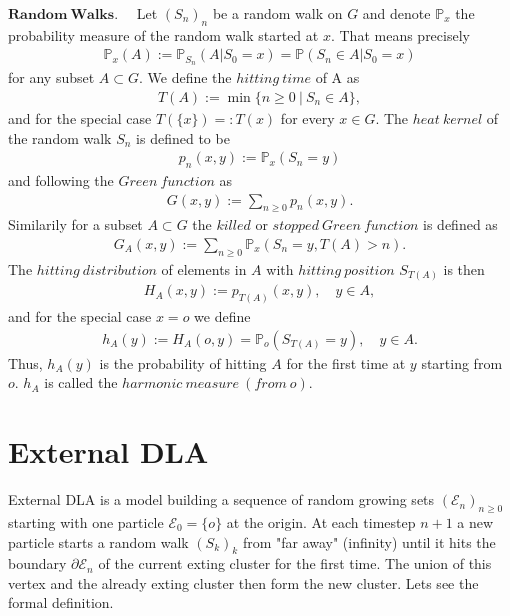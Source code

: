 \documentclass[12pt,a4paper]{scrartcl}
\numberwithin{equation}{section}
\numberwithin{equation}{section}%
\theoremstyle{definition}
\theoremstyle{definition}
\begin{document}
\noindent $\boldsymbol{Random\ Walks}.\quad$ Let $(S_n)_n$ be a random walk on $G$ and denote $\mathbb{P}_x$ the probability measure of the random walk started at $x$. That means precisely 
\begin{align*}
	\mathbb{P}_x(A) := \mathbb{P}_{S_n}(A|S_0=x) = \mathbb{P}(S_n\in A|S_0=x)
\end{align*}
for any subset $A\subset G$. We define the $hitting\ time$ of A as 
\begin{align*}
	T(A) := \min \{n\geq 0\ |\ S_n\in A\},
\end{align*}
and for the special case $T(\{x\})=:T(x)$ for every $x\in G$. The $heat\ kernel$ of the random walk $S_n$ is defined to be 
\begin{align*}
	p_n(x,y):=\mathbb{P}_x(S_n=y)
\end{align*}
and following the $Green\ function$ as 
\begin{align*}
	G(x,y) := \sum_{n\geq 0} p_n(x,y).
\end{align*}
Similarily for a subset $A\subset G$ the $killed$ or $stopped\ Green\ function$ is defined as
\begin{align*}
	G_A(x,y) := \sum_{n\geq 0} \mathbb{P}_x(S_n=y, T(A) > n).
\end{align*} 
\noindent The $hitting\ distribution$ of elements in $A$ with $hitting\ position$ $S_{T(A)}$ is then
\begin{align*}
	H_A(x,y) := p_{T(A)}(x,y),\quad y\in A, 
\end{align*}
and for the special case $x=o$ we define
\begin{align*}
	h_A(y) := H_A(o,y) = \mathbb{P}_o(S_{T(A)}=y),\quad y\in A.
\end{align*}
Thus, $h_A(y)$ is the probability of hitting $A$ for the first time at $y$ starting from $o$. $h_A$ is called the $harmonic\ measure\ (from\ o)$.

\newpage
\section{External DLA}

External DLA is a model building a sequence of random growing sets $(\mathcal{E}_n)_{n\geq 0}$ starting with one particle $\mathcal{E}_0=\{o\}$ at the origin. At each timestep $n+1$ a new particle starts a random walk $(S_k)_k$ from "far away" (infinity) until it hits the boundary $\partial \mathcal{E}_n$ of the current exting cluster for the first time. The union of this vertex and the already exting cluster then form the new cluster. Lets see the formal definition.
\end{document}
